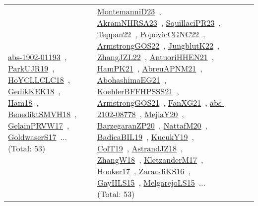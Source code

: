 {\begin{longtable}{lp{3cm}>{\raggedright\arraybackslash}p{6cm}>{\raggedright\arraybackslash}p{6cm}>{\raggedright\arraybackslash}p{8cm}}
\href{works/abs-1902-01193.pdf}{abs-1902-01193}~\cite{abs-1902-01193}, \href{works/ParkUJR19.pdf}{ParkUJR19}~\cite{ParkUJR19}, \href{works/HoYCLLCLC18.pdf}{HoYCLLCLC18}~\cite{HoYCLLCLC18}, \href{works/GedikKEK18.pdf}{GedikKEK18}~\cite{GedikKEK18}, \href{works/Ham18.pdf}{Ham18}~\cite{Ham18}, \href{works/BenediktSMVH18.pdf}{BenediktSMVH18}~\cite{BenediktSMVH18}, \href{works/GelainPRVW17.pdf}{GelainPRVW17}~\cite{GelainPRVW17}, \href{works/GoldwaserS17.pdf}{GoldwaserS17}~\cite{GoldwaserS17}... (Total: 53) & \href{works/MontemanniD23.pdf}{MontemanniD23}~\cite{MontemanniD23}, \href{works/AkramNHRSA23.pdf}{AkramNHRSA23}~\cite{AkramNHRSA23}, \href{works/SquillaciPR23.pdf}{SquillaciPR23}~\cite{SquillaciPR23}, \href{works/Teppan22.pdf}{Teppan22}~\cite{Teppan22}, \href{works/PopovicCGNC22.pdf}{PopovicCGNC22}~\cite{PopovicCGNC22}, \href{works/ArmstrongGOS22.pdf}{ArmstrongGOS22}~\cite{ArmstrongGOS22}, \href{works/JungblutK22.pdf}{JungblutK22}~\cite{JungblutK22}, \href{works/ZhangJZL22.pdf}{ZhangJZL22}~\cite{ZhangJZL22}, \href{works/AntuoriHHEN21.pdf}{AntuoriHHEN21}~\cite{AntuoriHHEN21}, \href{works/HamPK21.pdf}{HamPK21}~\cite{HamPK21}, \href{works/AbreuAPNM21.pdf}{AbreuAPNM21}~\cite{AbreuAPNM21}, \href{works/AbohashimaEG21.pdf}{AbohashimaEG21}~\cite{AbohashimaEG21}, \href{works/KoehlerBFFHPSSS21.pdf}{KoehlerBFFHPSSS21}~\cite{KoehlerBFFHPSSS21}, \href{works/ArmstrongGOS21.pdf}{ArmstrongGOS21}~\cite{ArmstrongGOS21}, \href{works/FanXG21.pdf}{FanXG21}~\cite{FanXG21}, \href{works/abs-2102-08778.pdf}{abs-2102-08778}~\cite{abs-2102-08778}, \href{works/MejiaY20.pdf}{MejiaY20}~\cite{MejiaY20}, \href{works/BarzegaranZP20.pdf}{BarzegaranZP20}~\cite{BarzegaranZP20}, \href{works/NattafM20.pdf}{NattafM20}~\cite{NattafM20}, \href{works/BadicaBIL19.pdf}{BadicaBIL19}~\cite{BadicaBIL19}, \href{works/KucukY19.pdf}{KucukY19}~\cite{KucukY19}, \href{works/ColT19.pdf}{ColT19}~\cite{ColT19}, \href{works/AstrandJZ18.pdf}{AstrandJZ18}~\cite{AstrandJZ18}, \href{works/ZhangW18.pdf}{ZhangW18}~\cite{ZhangW18}, \href{works/KletzanderM17.pdf}{KletzanderM17}~\cite{KletzanderM17}, \href{works/Hooker17.pdf}{Hooker17}~\cite{Hooker17}, \href{works/ZarandiKS16.pdf}{ZarandiKS16}~\cite{ZarandiKS16}, \href{works/GayHLS15.pdf}{GayHLS15}~\cite{GayHLS15}, \href{works/MelgarejoLS15.pdf}{MelgarejoLS15}~\cite{MelgarejoLS15}... (Total: 53)\\

\end{longtable}}
